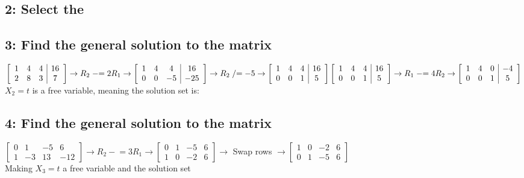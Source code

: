 \documentclass{article}
\begin{document}
\subsection*{2: Select the }
\subsection*{3: Find the general solution to the matrix}
$\left[\begin{array}{ccc|c}
1&4&4&16\\
2&8&3&7
\end{array}\right] \rightarrow R_2 \mathrel{-}= 2R_1\rightarrow 
\left[\begin{array}{ccc|c}
1&4&4&16\\
0&0&-5&-25
\end{array}\right]\rightarrow  R_2 \mathrel{/}= -5\rightarrow
\left[\begin{array}{ccc|c}
1&4&4&16\\
0&0&1&5
\end{array}\right]\\[3mm]
\left[\begin{array}{ccc|c}
1&4&4&16\\
0&0&1&5
\end{array}\right] \rightarrow R_1 \mathrel{-}=4R_2 \rightarrow
\left[\begin{array}{ccc|c}
1&4&0&-4\\
0&0&1&5
\end{array}\right] 
$\\[3mm] $X_2 = t$ is a free variable, meaning the solution set is: 
\subsection*{4: Find the general solution to the matrix}

$\left[\begin{array}{ccc|c}
    0&1&-5&6\\
    1&-3&13&-12
    \end{array}\right] \rightarrow R_2 \mathrel{-}=3R_1 \rightarrow
    \left[\begin{array}{ccc|c}
    0&1&-5&6\\
    1&0&-2&6
    \end{array}\right] \rightarrow$ Swap rows $\rightarrow
    \left[\begin{array}{ccc|c}
    1&0&-2&6\\
    0&1&-5&6
    \end{array}\right]$ \\[3mm] Making $X_3 = t$ a free variable and the solution set 
\end{document}
